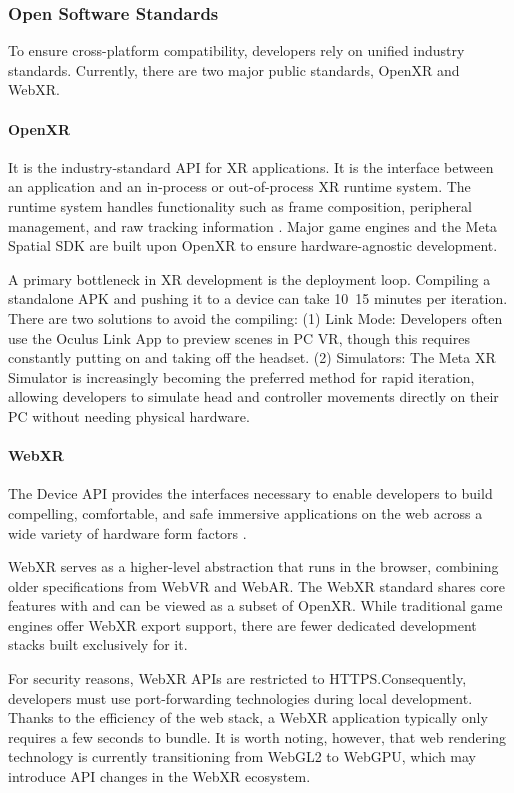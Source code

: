 \subsubsection{Open Software Standards}

To ensure cross-platform compatibility, developers rely on unified industry standards. Currently, there are two major public standards, OpenXR and WebXR.

\paragraph{OpenXR}

It is the industry-standard API for XR applications. It is the interface between an application and an in-process or out-of-process XR runtime system. The runtime system handles functionality such as frame composition, peripheral management, and raw tracking information \parencite{openxr2024spec}. Major game engines and the Meta Spatial SDK are built upon OpenXR to ensure hardware-agnostic development. 

A primary bottleneck in XR development is the deployment loop. Compiling a standalone APK and pushing it to a device can take 10~15 minutes per iteration. There are two solutions to avoid the compiling: (1) Link Mode: Developers often use the Oculus Link App to preview scenes in PC VR, though this requires constantly putting on and taking off the headset. (2) Simulators: The Meta XR Simulator is increasingly becoming the preferred method for rapid iteration, allowing developers to simulate head and controller movements directly on their PC without needing physical hardware.

\paragraph{WebXR}

The Device API provides the interfaces necessary to enable developers to build compelling, comfortable, and safe immersive applications on the web across a wide variety of hardware form factors \parencite{w3c2022webxr}.

WebXR serves as a higher-level abstraction that runs in the browser, combining older specifications from WebVR and WebAR. The WebXR standard shares core features with and can be viewed as a subset of OpenXR. While traditional game engines offer WebXR export support, there are fewer dedicated development stacks built exclusively for it. 

For security reasons, WebXR APIs are restricted to HTTPS.Consequently, developers must use port-forwarding technologies during local development. Thanks to the efficiency of the web stack, a WebXR application typically only requires a few seconds to bundle. It is worth noting, however, that web rendering technology is currently transitioning from WebGL2 to WebGPU, which may introduce API changes in the WebXR ecosystem.

